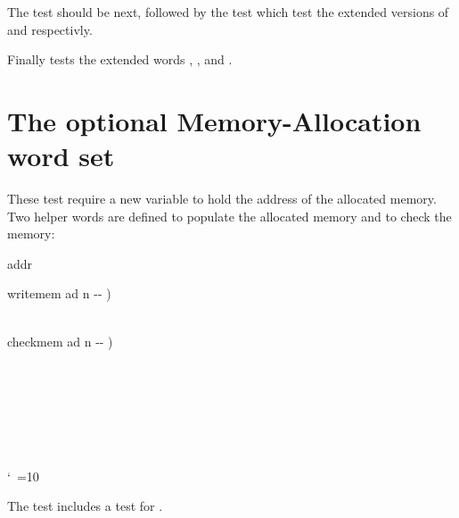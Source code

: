 The  test should be next, followed by
 the test which test the extended versions of
 and  respectivly.

Finally  tests the extended words
, , and .





\section{The optional Memory-Allocation word set} %

These test require a new variable to hold the address of the allocated
memory.  Two helper words are defined to populate the allocated memory
and to check the memory:

\begin{tt}\frenchspacing\obeyspaces
{} addr

\word{:} writemem  ad n -{}- ) \\
         \\
\word{;}

\word{:} checkmem  ad n -{}- ) \\
  \\
\tab[2]     \\
\tab[2]  \\
\tab[2]   \\
\tab {} \\
\tab {} \\
\word{;}
\end{tt}
\nonfrenchspacing\catcode`\ =10

The test  includes a test for .



